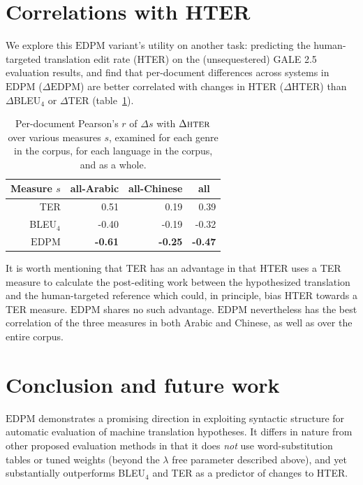 \documentclass[11pt]{article}
\newcommand{\myEDPM}[0]{\ensuremath{\mathrm{EDPM}}}
\begin{document}
\section{Correlations with HTER}
\label{sec:hter}

We explore this \myEDPM{} variant's utility on another task:
predicting the human-targeted translation edit rate (HTER) on the
(unsequestered) GALE 2.5 evaluation results, and find that
per-document differences across systems in \myEDPM{} ($\Delta$\myEDPM)
are better correlated with changes in HTER ($\Delta$HTER) than
$\Delta$BLEU$_4$ or $\Delta$TER (table~\ref{tab:hter:perdoc1}).

\begin{table}
  \centering
  \begin{tabular}{r|r|r||r}
     \multicolumn{1}{c|}{Measure $s$} 
     & \multicolumn{1}{c|}{all-Arabic} &
     \multicolumn{1}{c||}{all-Chinese} &\multicolumn{1}{c}{all}\\
    \hline{}
    TER      &  0.51 &  0.19 &  0.39 \\
    BLEU$_4$ & -0.40 & -0.19 & -0.32 \\
    \myEDPM  & 
       \textbf{-0.61}&
               \textbf{-0.25}&
                       \textbf{-0.47}\\
  \end{tabular}
  \caption{Per-document Pearson's $r$ of $\Delta s$ with $\Delta\textsc{hter}$ over
    various measures $s$, examined for each genre in the corpus, for each
    language in the corpus, and as a whole. }
  \label{tab:hter:perdoc1}
\end{table}

It is worth mentioning that TER has an advantage in that HTER uses a
TER measure to calculate the post-editing work between the
hypothesized translation and the human-targeted reference which could,
in principle, bias HTER towards a TER measure. \myEDPM{} shares no
such advantage.  \myEDPM{} nevertheless has the best correlation of
the three measures in both Arabic and Chinese, as well as over the
entire corpus.
\section{Conclusion and future work}
\label{sec:conclusion}

\myEDPM{} demonstrates a promising direction in exploiting syntactic
structure for automatic evaluation of machine translation hypotheses.
It differs in nature from other proposed evaluation methods in that it
does \emph{not} use word-substitution tables or tuned weights (beyond
the $\lambda$ free parameter described above), and yet substantially
outperforms BLEU$_4$ and TER as a predictor of changes to HTER.
\end{document}

